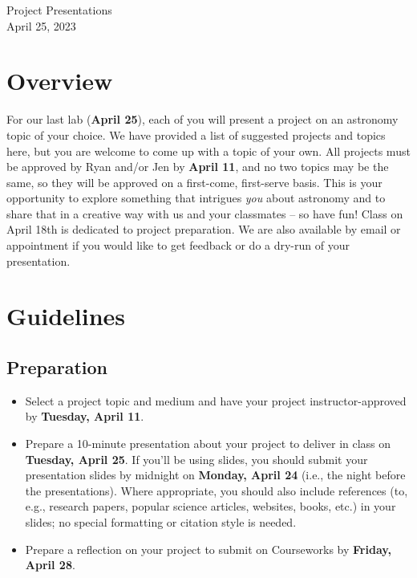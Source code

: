 \documentclass[11pt]{article}
\begin{document}
\begin{center}
\huge{Project Presentations}\\ \medskip \Large{April 25, 2023}
\end{center}

\section{Overview}
For our last lab (\textbf{April 25}), each of you will present a project on an astronomy topic of your choice.  We have provided a list of suggested projects and topics here, but you are welcome to come up with a topic of your own.  All projects must be approved by Ryan and/or Jen by \textbf{April 11}, and no two topics may be the same, so they will be approved on a first-come, first-serve basis.  This is your opportunity to explore something that intrigues \textit{you} about astronomy and to share that in a creative way with us and your classmates -- so have fun!  Class on April 18th is dedicated to project preparation. We are also available by email or appointment if you would like to get feedback or do a dry-run of your presentation.

\section{Guidelines}
\subsection*{Preparation}
\begin{itemize}[noitemsep]
    \item Select a project topic and medium and have your project instructor-approved by \textbf{Tuesday, April 11}.
    \item Prepare a 10-minute presentation about your project to deliver in class on \textbf{Tuesday, April 25}. If you'll be using slides, you should submit your presentation slides by midnight on \textbf{Monday, April 24} (i.e., the night before the presentations). Where appropriate, you should also include references (to, e.g., research papers, popular science articles, websites, books, etc.) in your slides; no special formatting or citation style is needed.
    \item Prepare a reflection on your project to submit on Courseworks by \textbf{Friday, April 28}.
\end{itemize}
\end{document}

